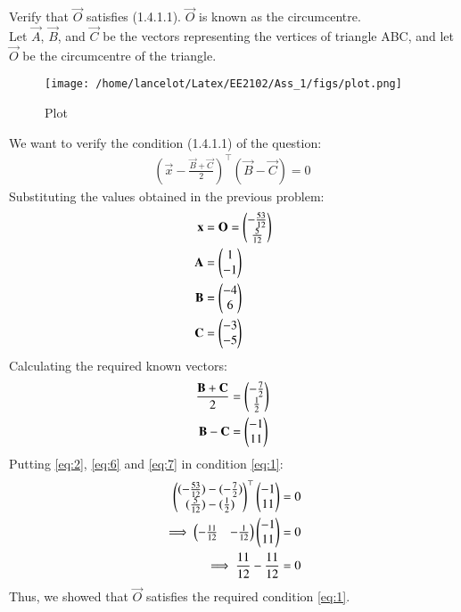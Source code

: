 \documentclass[journal,12pt,twocolumn]{IEEEtran}
\theoremstyle{remark}
\begin{document}



\maketitle

\newpage


\bigskip

\renewcommand{\thefigure}{\theenumi}
\renewcommand{\thetable}{\theenumi}

Verify that $\vec{O}$ satisfies (1.4.1.1). $\vec{O}$ is known as the circumcentre.\\\solution
Let $\vec{A}$, $\vec{B}$, and $\vec{C}$ be the vectors representing the vertices of triangle ABC, and let $\vec{O}$ be the circumcentre of the triangle.
\begin{figure}[h]
\texttt{[image: /home/lancelot/Latex/EE2102/Ass\_1/figs/plot.png]}
\label{fig:circumcircle}
\caption{Plot}
\end{figure}
We want to verify the condition (1.4.1.1) of the question:
\begin{align}
(\vec{x} - \frac{\vec{B} + \vec{C}}{2})^\top(\vec{B} - \vec{C}) = 0\label{eq:1}\
\end{align}
Substituting the values obtained in the previous problem:
\begin{align}
\mathbf{x} &= \mathbf{O} = \begin{pmatrix}-\frac{53}{12}\\\frac{5}{12}\end{pmatrix}\label{eq:2}\\
\mathbf{A} &= \begin{pmatrix}1\\-1\end{pmatrix}\label{eq:3}\\
\mathbf{B} &= \begin{pmatrix}-4\\6\end{pmatrix}\label{eq:4}\\
\mathbf{C} &= \begin{pmatrix}-3\\-5\end{pmatrix}\label{eq:5}
\end{align}
Calculating the required known vectors:
\begin{align}
\frac{\mathbf{B} + \mathbf{C}}{2} &= \begin{pmatrix}-\frac{7}{2}\\\frac{1}{2}\end{pmatrix}\label{eq:6}\\\
\mathbf{B} - \mathbf{C} &= \begin{pmatrix}-1\\11\end{pmatrix}\label{eq:7}\
\end{align}
Putting \eqref{eq:2}, \eqref{eq:6} and \eqref{eq:7} in condition \eqref{eq:1}:
\begin{align}
\begin{pmatrix}(-\frac{53}{12})-(-\frac{7}{2})\\(\frac{5}{12})-(\frac{1}{2})\end{pmatrix}^\top\begin{pmatrix}-1\\11\end{pmatrix} &= 0\label{eq:8}\\
\implies \begin{pmatrix}-\frac{11}{12}&-\frac{1}{12}\end{pmatrix}\begin{pmatrix}-1\\11\end{pmatrix} &= 0\label{eq:9}\\
\implies \frac{11}{12}-\frac{11}{12}&= 0\label{eq:10} 
\end{align}
Thus, we showed that $\vec{O}$ satisfies the required condition \eqref{eq:1}. 
\end{document}
